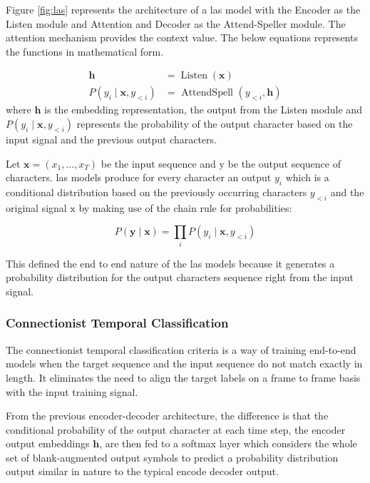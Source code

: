 Figure \ref{fig:las} represents the architecture of a \acrshort{las} model with the Encoder as the Listen module and Attention and Decoder as the Attend-Speller module. The attention mechanism provides the context value. The below equations represents the functions in mathematical form.

$$
\begin{aligned}
\mathbf{h} &=\operatorname{Listen}(\mathbf{x}) \\
P\left(y_{i} \mid \mathbf{x}, y_{<i}\right) &=\text { AttendSpell }\left(y_{<i}, \mathbf{h}\right)
\end{aligned}
$$
where $ \mathbf{h}$ is the embedding representation, the output from the Listen module and $P\left(y_{i} \mid \mathbf{x}, y_{<i}\right)$ represents the probability of the output character based on the input signal and the previous output characters.

Let $\mathbf{x}=\left(x_{1}, \ldots, x_{T}\right)$ be the input sequence and $\mathrm{y}$ be the output sequence of characters. \acrshort{las} models produce for every character an output $y_{i}$ which is a conditional distribution based on the previously occurring characters $y_{<i}$ and the original signal $\mathrm{x}$ by making use of the chain rule for probabilities:

$$
P(\mathbf{y} \mid \mathbf{x})=\prod_{i} P\left(y_{i} \mid \mathbf{x}, y_{<i}\right)
$$

This defined the end to end nature of the \acrshort{las} models because it generates a probability distribution for the output characters sequence right from the input signal. 

\subsubsection{Connectionist Temporal Classification}
\label{section:ctc}
The connectionist temporal classification criteria is a way of training end-to-end models when the target sequence and the input sequence do not match exactly in length. It eliminates the need to align the target labels on a frame to frame basis with the input training signal. 

From the previous encoder-decoder architecture, the difference is that the conditional probability of the output character at each time step, the encoder output embeddings $\mathbf{h}$, are then fed to a softmax layer which considers the whole set of blank-augmented output symbols to predict a probability distribution output similar in nature to the typical encode decoder output.


